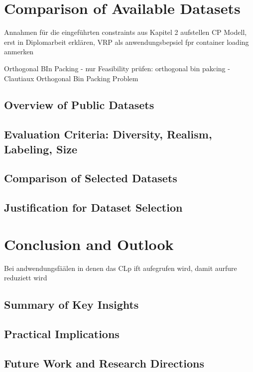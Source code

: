

\chapter{Comparison of Available Datasets}
Annahmen für die eingeführten constraints aus Kapitel 2 aufstellen
CP Modell, erst in Diplomarbeit erklären,
VRP als anwendungsbepsiel fpr container loading anmerken

Orthogonal BIn Packing - nur Feasibility prüfen:
orthogonal bin pakcing - Clautiaux Orthogonal Bin Packing Problem


\section{Overview of Public Datasets}
\section{Evaluation Criteria: Diversity, Realism, Labeling, Size}
\section{Comparison of Selected Datasets}
\section{Justification for Dataset Selection}

\chapter{Conclusion and Outlook}
Bei andwendungsfäälen in denen das CLp ift aufegrufen wird, damit aurfure reduziett wird
\section{Summary of Key Insights}
\section{Practical Implications}
\section{Future Work and Research Directions}
